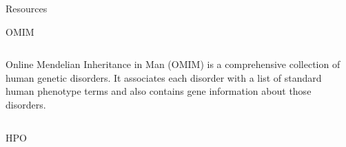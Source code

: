 \documentclass[final]{beamer} %
\begin{document}
\begin{frame}{}
\begin{columns}[T]
\begin{column}{0.3\linewidth}
\begin{block}{\Huge Resources}
\begin{block}{\Large OMIM}
\begin{columns}[T]
        \begin{column}{.5\textwidth}
        \Large
        Online Mendelian Inheritance in Man (OMIM) is a comprehensive collection of human genetic disorders. It associates each disorder with a list of standard human phenotype terms and also contains gene information about those disorders. 
       \end{column}
    \end{columns}
    \end{block}

    \begin{block}{\Large HPO}
   \begin{columns}[T]
      \begin{column}{.5\textwidth}
      \centering
      \vspace{1cm}

\end{column}
\end{columns}
\end{block}
\end{block}
\end{column}
\end{columns}
\end{frame}
\end{document}
